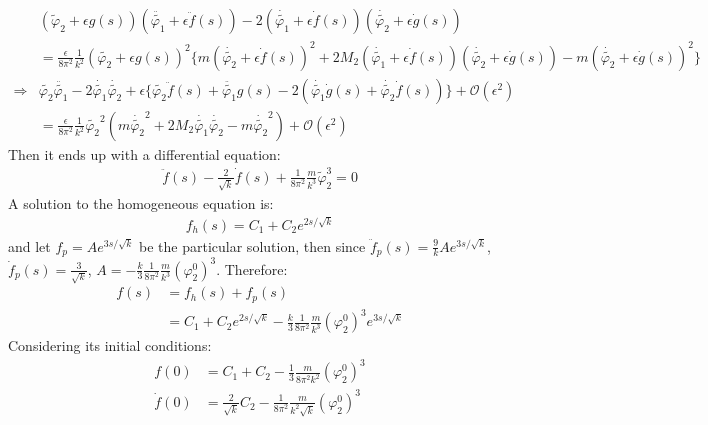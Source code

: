 \begin{align}
    &(\tilde \varphi_{2} + \epsilon g(s))(\ddot {\tilde {\varphi_{1}}} + \epsilon \ddot f(s)) - 2 (\dot {\tilde{\varphi_{1}}} + \epsilon \dot {f}(s))(\dot {\tilde{\varphi_{2}}} +\epsilon \dot{g}(s)) \nonumber \\
    &= \frac{\epsilon}{8\pi^{2}}\frac{1}{k^2} (\tilde{\varphi_{2}} + \epsilon g(s))^{2}\lbrace m(\dot{\tilde{\varphi_{2}}} + \epsilon \dot{f}(s))^{2} +2M_{2} (\dot{\tilde{\varphi_{1}}} + \epsilon \dot{f}(s))(\dot{\tilde{\varphi_{2}}} + \epsilon \dot{g}(s)) - m (\dot{\tilde{\varphi_{2}}} + \epsilon \dot{g}(s))^{2} \rbrace \nonumber \\
    \Rightarrow &\tilde{\varphi_{2}}\ddot{\tilde{\varphi_{1}}}-2\dot{\tilde{\varphi_{1}}}\dot{\tilde{\varphi_{2}}} + \epsilon\lbrace \tilde{\varphi_{2}}\ddot{f}(s) + \ddot{\tilde{\varphi_{1}}}g(s) - 2(\dot{\tilde{\varphi_{1}}}\dot{g}(s) + \dot{\tilde{\varphi_{2}}}\dot{f}(s)) \rbrace  + \mathcal{O}(\epsilon ^{2}) \nonumber \\
    &= \frac{\epsilon}{8\pi^{2}}\frac{1}{k^{2}} \tilde{\varphi _{2}} ^{2} (m\dot{\tilde{\varphi_{2}}} ^{2} + 2M_{2} \dot{\tilde{\varphi_{1}}}\dot{\tilde{\varphi_{2}}} -m \dot{\tilde{\varphi_{2}}}^{2}) + \mathcal{O}(\epsilon^{2}) \nonumber
\end{align}
Then it ends up with a differential equation:
\begin{align}
    \label{eq:2.84}
    \ddot{f} (s) - \frac{2}{\sqrt{k}} \dot {f} (s)+ \frac{1}{8\pi^{2}} \frac{m}{k^{3}}\tilde \varphi_{2} ^{3} = 0 
\end{align}
A solution to the homogeneous equation is:
\begin{align}
    f_{h} (s) = C_{1} + C_{2} e^{2s/\sqrt{k}} 
\end{align}
and let $f_{p} = A e^{3s/ \sqrt{k}}$ be the particular solution, then since $\ddot f_{p} (s) = \frac{9}{k} Ae^{3s/\sqrt{k}}$, $\dot f_{p} (s) = \frac{3}{\sqrt{k}}$, $A = -\frac{k}{3} \frac{1}{8\pi^{2}}\frac{m}{k^{3}} (\varphi_{2}^{0})^{3}$. Therefore:
\begin{align}
    f(s) &= f_{h}(s) + f_{p}(s) \nonumber \\
    &= C_{1} + C_{2} e^{2s/\sqrt{k}} - \frac{k}{3}\frac{1}{8\pi^{2}}\frac{m}{k^{3}}(\varphi_{2}^{0})^{3} e^{3s/\sqrt{k}}
\end{align}
Considering its initial conditions:
\begin{align}
    f(0) &= C_{1} + C_{2} - \frac{1}{3}\frac{m}{8\pi^{2}k^{2}}(\varphi_{2}^{0})^{3} \\
    \dot{f}(0) &= \frac{2}{\sqrt{k}}C_{2} -  \frac{1}{8\pi^{2}}\frac{m}{k^{2}\sqrt{k}}(\varphi_{2}^{0})^{3}
\end{align}
